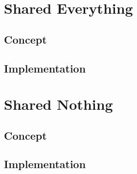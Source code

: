 \documentclass[onecolumn, draftclsnofoot,10pt, compsoc]{IEEEtran}
\begin{document}
	\section{Shared Everything}

    \subsection{Concept}

    \subsection{Implementation}


	\section{Shared Nothing}

    \subsection{Concept}

    \subsection{Implementation}
	
\nocite{*}


\end{document}
